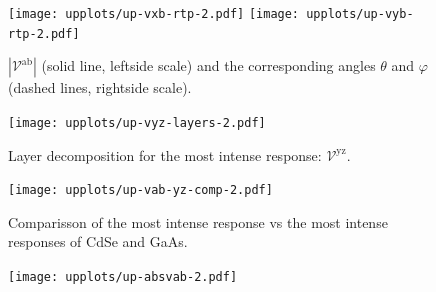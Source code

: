 \documentclass[twocolumn]{article}
\let\Oldsubsection\subsection
\renewcommand{\subsection}{\FloatBarrier\Oldsubsection}
\begin{document}
\begin{figure}[ht]
    \centering
    \texttt{[image: upplots/up-vxb-rtp-2.pdf]}
    \texttt{[image: upplots/up-vyb-rtp-2.pdf]}
    \caption{$|\mathcal{V}^{\mathrm{ab}}|$ (solid line, leftside scale) and the
    corresponding angles $\theta$ and $\varphi$ (dashed lines, rightside scale).}
    \label{fig:up-rtp2}
\end{figure}

\begin{figure}[ht]
    \centering
    \texttt{[image: upplots/up-vyz-layers-2.pdf]}
    \caption{Layer decomposition for the most intense response:
    $\mathcal{V}^{\mathrm{yz}}$.}
    \label{fig:up-lay2}
\end{figure}

\begin{figure}[ht]
    \centering
    \texttt{[image: upplots/up-vab-yz-comp-2.pdf]}
    \caption{Comparisson of the most intense response vs the most intense
    responses of CdSe and GaAs.}
    \label{fig:up-comp2}
\end{figure}

\begin{figure}[ht]
    \centering
    \texttt{[image: upplots/up-absvab-2.pdf]}
    \label{fig:up-xbybcomp-2}
\end{figure}



\end{document}
